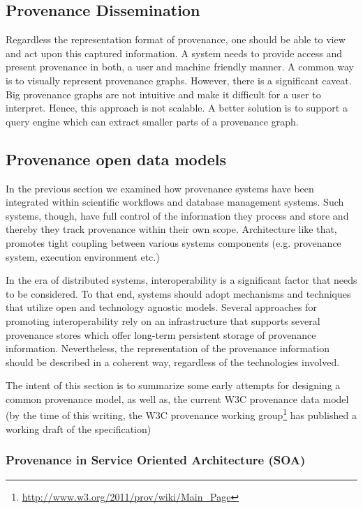 \subsection{Provenance Dissemination}

Regardless the representation format of provenance, one should be able to view and act upon this captured information. A system needs to provide access and present provenance in both, a user and machine friendly manner. A common way is to visually represent provenance graphs. However, there is a significant caveat. Big provenance graphs are not intuitive and make it difficult for a user to interpret. Hence, this approach is not scalable. A better solution is to support a query engine which can extract smaller parts of a provenance graph.

\subsection{Provenance open data models}

In the previous section we examined how provenance systems have been integrated within scientific workflows and database management systems. Such systems, though, have full control of the information they process and store and thereby they track provenance within their own scope. Architecture like that, promotes tight coupling between various systems components (e.g. provenance system, execution environment etc.)\cite{reference8}

In the era of distributed systems, interoperability is a significant factor that needs to be considered. To that end, systems should adopt mechanisms and techniques that utilize open and technology agnostic models. Several approaches for promoting interoperability rely on an infrastructure that supports several provenance stores\cite{reference8:55}\cite{reference8:56} which offer long-term persistent storage of provenance information. Nevertheless, the representation of the provenance information should be described in a coherent way, regardless of the technologies involved.

The intent of this section is to summarize some early attempts for designing a common provenance model, as well as, the current W3C provenance data model (by the time of this writing, the W3C provenance working group\footnote{\url{http://www.w3.org/2011/prov/wiki/Main_Page}} has published a working draft of the specification)


\subsubsection{Provenance in Service Oriented Architecture (SOA)}

